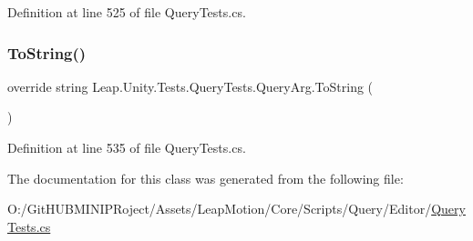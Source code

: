 Definition at line 525 of file Query\+Tests.\+cs.

\mbox{\label{class_leap_1_1_unity_1_1_tests_1_1_query_tests_1_1_query_arg_a2570909fa1bdd4d951f8b470e7542015}} 
\subsubsection{\texorpdfstring{ToString()}{ToString()}}
{\footnotesize\ttfamily override string Leap.\+Unity.\+Tests.\+Query\+Tests.\+Query\+Arg.\+To\+String (\begin{DoxyParamCaption}{ }\end{DoxyParamCaption})}



Definition at line 535 of file Query\+Tests.\+cs.



The documentation for this class was generated from the following file\+:\begin{DoxyCompactItemize}
\item 
O\+:/\+Git\+H\+U\+B\+M\+I\+N\+I\+P\+Roject/\+Assets/\+Leap\+Motion/\+Core/\+Scripts/\+Query/\+Editor/\mbox{\hyperlink{_query_tests_8cs}{Query\+Tests.\+cs}}\end{DoxyCompactItemize}
